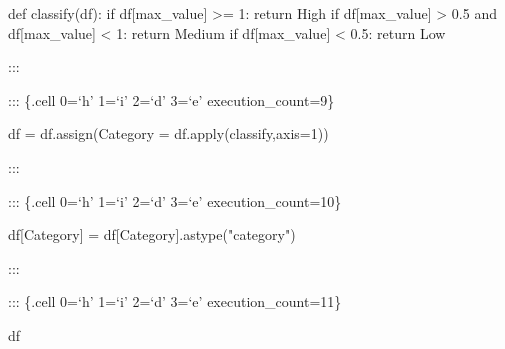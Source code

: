 \documentclass[
  letterpaper,
  DIV=11,
  numbers=noendperiod]{scrreport}
\newenvironment{Shaded}{\begin{snugshade}}{\end{snugshade}}
\newcommand{\BuiltInTok}[1]{\textcolor[rgb]{0.00,0.23,0.31}{#1}}
\newcommand{\ControlFlowTok}[1]{\textcolor[rgb]{0.00,0.23,0.31}{#1}}
\newcommand{\DecValTok}[1]{\textcolor[rgb]{0.68,0.00,0.00}{#1}}
\newcommand{\FloatTok}[1]{\textcolor[rgb]{0.68,0.00,0.00}{#1}}
\newcommand{\KeywordTok}[1]{\textcolor[rgb]{0.00,0.23,0.31}{#1}}
\newcommand{\NormalTok}[1]{\textcolor[rgb]{0.00,0.23,0.31}{#1}}
\newcommand{\OperatorTok}[1]{\textcolor[rgb]{0.37,0.37,0.37}{#1}}
\newcommand{\StringTok}[1]{\textcolor[rgb]{0.13,0.47,0.30}{#1}}
\begin{document}
\begin{Shaded}
\begin{Highlighting}[]
\KeywordTok{def}\NormalTok{ classify(df):}
    \ControlFlowTok{if}\NormalTok{ df[}\StringTok{\textquotesingle{}max\_value\textquotesingle{}}\NormalTok{] }\OperatorTok{\textgreater{}=} \DecValTok{1}\NormalTok{:}
        \ControlFlowTok{return} \StringTok{\textquotesingle{}High\textquotesingle{}}
    \ControlFlowTok{if}\NormalTok{ df[}\StringTok{\textquotesingle{}max\_value\textquotesingle{}}\NormalTok{] }\OperatorTok{\textgreater{}} \FloatTok{0.5} \KeywordTok{and}\NormalTok{ df[}\StringTok{\textquotesingle{}max\_value\textquotesingle{}}\NormalTok{] }\OperatorTok{\textless{}} \DecValTok{1}\NormalTok{:}
        \ControlFlowTok{return} \StringTok{\textquotesingle{}Medium\textquotesingle{}}
    \ControlFlowTok{if}\NormalTok{ df[}\StringTok{\textquotesingle{}max\_value\textquotesingle{}}\NormalTok{] }\OperatorTok{\textless{}} \FloatTok{0.5}\NormalTok{:}
        \ControlFlowTok{return} \StringTok{\textquotesingle{}Low\textquotesingle{}}
\end{Highlighting}
\end{Shaded}

:::

::: \{.cell 0=`h' 1=`i' 2=`d' 3=`e' execution\_count=9\}

\begin{Shaded}
\begin{Highlighting}[]
\NormalTok{df }\OperatorTok{=}\NormalTok{ df.assign(Category }\OperatorTok{=}\NormalTok{ df.}\BuiltInTok{apply}\NormalTok{(classify,axis}\OperatorTok{=}\DecValTok{1}\NormalTok{))}
\end{Highlighting}
\end{Shaded}

:::

::: \{.cell 0=`h' 1=`i' 2=`d' 3=`e' execution\_count=10\}

\begin{Shaded}
\begin{Highlighting}[]
\NormalTok{df[}\StringTok{\textquotesingle{}Category\textquotesingle{}}\NormalTok{] }\OperatorTok{=}\NormalTok{ df[}\StringTok{\textquotesingle{}Category\textquotesingle{}}\NormalTok{].astype(}\StringTok{"category"}\NormalTok{)}
\end{Highlighting}
\end{Shaded}

:::

::: \{.cell 0=`h' 1=`i' 2=`d' 3=`e' execution\_count=11\}

\begin{Shaded}
\begin{Highlighting}[]
\NormalTok{df}
\end{Highlighting}
\end{Shaded}
\end{document}
